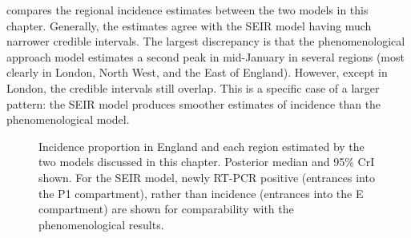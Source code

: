 \documentclass[thesis.tex]{subfiles}
\begin{document}
 compares the regional incidence estimates between the two models in this chapter.
Generally, the estimates agree with the SEIR model having much narrower credible intervals.
The largest discrepancy is that the phenomenological approach model estimates a second peak in mid-January in several regions (most clearly in London, North West, and the East of England).
However, except in London, the credible intervals still overlap.
This is a specific case of a larger pattern: the SEIR model produces smoother estimates of incidence than the phenomenological model.
\begin{figure}
    \caption[Comparing each models estimate of regional incidence.]{%
        Incidence proportion in England and each region estimated by the two models discussed in this chapter.
        Posterior median and 95\% CrI shown.
        For the SEIR model, newly RT-PCR positive (entrances into the P1 compartment), rather than incidence (entrances into the E compartment) are shown for comparability with the phenomenological results.
    }
    \label{transmission:fig:compare-regions}
\end{figure}
\end{document}
